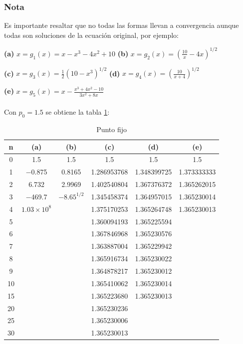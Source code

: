 \begin{tcolorbox}[colback=gray!5!]
\subsubsection*{Nota}
Es importante resaltar que no todas las formas llevan a convergencia aunque todas son soluciones de la ecuación original, por ejemplo:
\end{tcolorbox}

\quad\quad\quad \textbf{(a)} $x=g_1(x)=x-x^3-4x^2+10$
\quad\quad\quad \textbf{(b)} $x=g_2(x)=(\frac{10}{x}-4x)^{1/2}$

\quad\quad\quad \textbf{(c)} $x=g_3(x)=\frac{1}{2}(10-x^3)^{1/2}$
\quad\quad\quad \textbf{(d)} $x=g_4(x)=(\frac{10}{x+4})^{1/2}$

\quad\quad\quad \textbf{(e)} $x=g_5(x)=x-\frac{x^3+4x^2-10}{3x^2+8x}$
\\
\\

Con $p_0=1.5$ se obtiene la tabla \ref{tab:tabla4}:

\begin{table}[h!]
\centering
    \begin{tabular}{||c c c c c c||}
    \hline 
    \hline
        n & (a) & (b) & (c) & (d) & (e) \\
    \hline 
    \hline 
        0 & 1.5 & 1.5 & 1.5 & 1.5 & 1.5 \\
        1 & −0.875 & 0.8165 & 1.286953768 & 1.348399725 &  1.373333333 \\
        2 & 6.732 & 2.9969 & 1.402540804 & 1.367376372 & 1.365262015 \\
        3 & −469.7 & $−8.65^{1/2}$ & 1.345458374 & 1.364957015 &  1.365230014 \\
        4 & $1.03\times10^{8}$ &  & 1.375170253 & 1.365264748 &  1.365230013 \\
        5 &  &  & 1.360094193 & 1.365225594 & \\
        6 &  &  & 1.367846968 & 1.365230576 & \\
        7 &  &  & 1.363887004 & 1.365229942 & \\
        8 &  &  & 1.365916734 & 1.365230022 & \\
        9 &  &  & 1.364878217 & 1.365230012 & \\
        10 &  &  & 1.365410062 & 1.365230014 & \\
        15 &  &  & 1.365223680 & 1.365230013 & \\
        20 &  &  & 1.365230236 &  & \\
        25 &  &  & 1.365230006 &  & \\
        30 &  &  & 1.365230013 &  & \\
        \hline
        \hline 
    \end{tabular}
    \caption{Punto fijo}
    \label{tab:tabla4}
\end{table}


